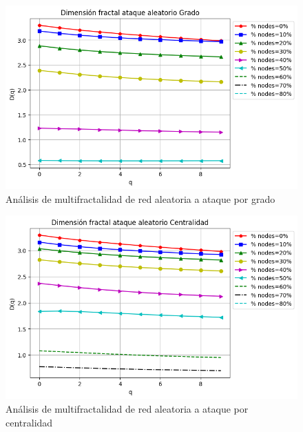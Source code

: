 \begin{figure}[H]
    \centering
    \includegraphics[scale=0.7]{Capitulo6MultifractalidadYRobustez/imagenes/grafica_DqDegree20180501_072543Random1991Nodes5939.png}
    \caption{Análisis de multifractalidad de red aleatoria a ataque por grado }
\end{figure}

\begin{figure}[H]
    \centering
    \includegraphics[scale=0.7]{Capitulo6MultifractalidadYRobustez/imagenes/grafica_DqCentrality20180501_072543Random1991Nodes5939.png}
    \caption{Análisis de multifractalidad de red aleatoria a ataque por centralidad }
\end{figure}


